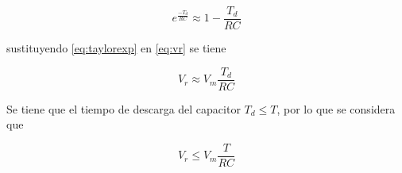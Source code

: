 \documentclass[letterpaper,14pt,english]{/usr/lib/python3.3/site-packages/sphinx/texinputs/sphinxhowto}
\begin{document}
\begin{equation}\label{eq:taylorexp}
e^{\frac{-T_{d}}{RC}}\approx 1-\frac{T_{d}}{RC}
\end{equation}

sustituyendo \eqref{eq:taylorexp} en \eqref{eq:vr} se tiene

\begin{equation}\label{eq:vr2}
V_{r}\approx V_{m}\frac{T_{d}}{RC}
\end{equation}

Se tiene que el tiempo de descarga del capacitor $T_{d} \leq T$, por lo
que se considera que

\begin{equation}\label{eq:vr3}
V_{r} \leq V_{m}\frac{T}{RC}
\end{equation}

\end{document}
